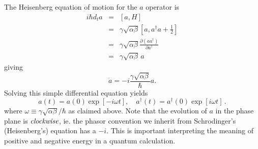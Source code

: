 The Heisenberg equation of motion for the $a$ operator is \begin{eqnarray*}
i\hbar d_{t}a & = & [a,H] \\
& = & \gamma\sqrt{\alpha\beta}[a,a^{\dagger}a+\frac{1}{2}] \\
& = & \gamma\sqrt{\alpha\beta}\frac{\partial(aa^{\dagger})}{\partial a^{\dagger}} \\
& = & \gamma\sqrt{\alpha\beta}\,a \end{eqnarray*}
giving \begin{equation}
\dot{a} = -i\frac{\gamma\sqrt{\alpha\beta}}{\hbar}a .\end{equation}
Solving this simple differential equation yields
\begin{equation}
a(t) = a(0)\exp\left[-i \omega t \right],
\quad
a^{\dagger}(t) = a^{\dagger}(0)\exp\left[i \omega t \right] \, .
\end{equation}
where $\omega \equiv \gamma\sqrt{\alpha\beta}/\hbar$ as claimed above.
Note that the evolution of $a$ in the phase plane is $\emph{clockwise}$, ie. the phasor convention we inherit from Schrodinger's (Heisenberg's) equation has a $-i$.
This is important interpreting the meaning of positive and negative energy in a quantum calculation.

